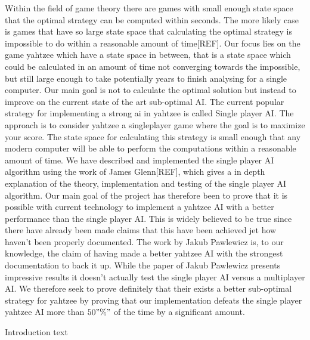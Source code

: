 Within the field of game theory there are games with small enough state space that the optimal strategy can be computed within seconds. The more likely case is games that have so large state space that calculating the optimal strategy is impossible to do within a reasonable amount of time[REF]. Our focus lies on the game yahtzee which have a state space in between, that is a state space which could be calculated in an amount of time not converging towards the impossible, but still large enough to take potentially years to finish analysing for a single computer. Our main goal is not to calculate the optimal solution but instead to improve on the current state of the art sub-optimal AI. The current popular strategy for implementing a strong ai in yahtzee is called Single player AI. The approach is to consider yahtzee a singleplayer game where the goal is to maximize your score. The state space for calculating this strategy is small enough that any modern computer will be able to perform the computations within a reasonable amount of time. We have described and implemented the single player AI algorithm using the work of James Glenn[REF], which gives a in depth explanation of the theory, implementation and testing of the single player AI algorithm. \newline \hspace*{20px} Our main goal of the project has therefore been to prove that it is possible with current technology to implement a yahtzee AI with a better performance than the single player AI. This is widely believed to be true since there have already been made claims that this have been achieved jet how haven't been properly documented. The work by Jakub Pawlewicz is, to our knowledge, the claim of having made a better yahtzee AI with the strongest documentation to back it up. While the paper of Jakub Pawlewicz presents impressive results it doesn't actually test the single player AI versus a multiplayer AI. We therefore seek to prove definitely that their exists a better sub-optimal strategy for yahtzee by proving that our implementation defeats the single player yahtzee AI more than $50"\%" $ of the time by a significant amount. 

Introduction text
